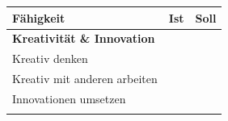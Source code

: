 \documentclass[
  ngerman,
  paper=a4,
,captions=tableheading
]{scrartcl}
\begin{document}
\begin{longtable}[]{@{}lll@{}}
\toprule
\begin{minipage}[b]{0.72\columnwidth}\raggedright
Fähigkeit\strut
\end{minipage} & \begin{minipage}[b]{0.10\columnwidth}\raggedright
Ist\strut
\end{minipage} & \begin{minipage}[b]{0.10\columnwidth}\raggedright
Soll\strut
\end{minipage}\tabularnewline
\midrule
\endhead
\begin{minipage}[t]{0.72\columnwidth}\raggedright
\textbf{Kreativität \& Innovation}\strut
\end{minipage} & \begin{minipage}[t]{0.10\columnwidth}\raggedright
\strut
\end{minipage} & \begin{minipage}[t]{0.10\columnwidth}\raggedright
\strut
\end{minipage}\tabularnewline
\begin{minipage}[t]{0.72\columnwidth}\raggedright
Kreativ denken\strut
\end{minipage} & \begin{minipage}[t]{0.10\columnwidth}\raggedright
\strut
\end{minipage} & \begin{minipage}[t]{0.10\columnwidth}\raggedright
\strut
\end{minipage}\tabularnewline
\begin{minipage}[t]{0.72\columnwidth}\raggedright
Kreativ mit anderen arbeiten\strut
\end{minipage} & \begin{minipage}[t]{0.10\columnwidth}\raggedright
\strut
\end{minipage} & \begin{minipage}[t]{0.10\columnwidth}\raggedright
\strut
\end{minipage}\tabularnewline
\begin{minipage}[t]{0.72\columnwidth}\raggedright
Innovationen umsetzen\strut
\end{minipage} & \begin{minipage}[t]{0.10\columnwidth}\raggedright
\strut
\end{minipage} & \begin{minipage}[t]{0.10\columnwidth}\raggedright
\strut
\end{minipage}\tabularnewline
\begin{minipage}[t]{0.72\columnwidth}\raggedright

\end{minipage}
\end{longtable}
\end{document}
